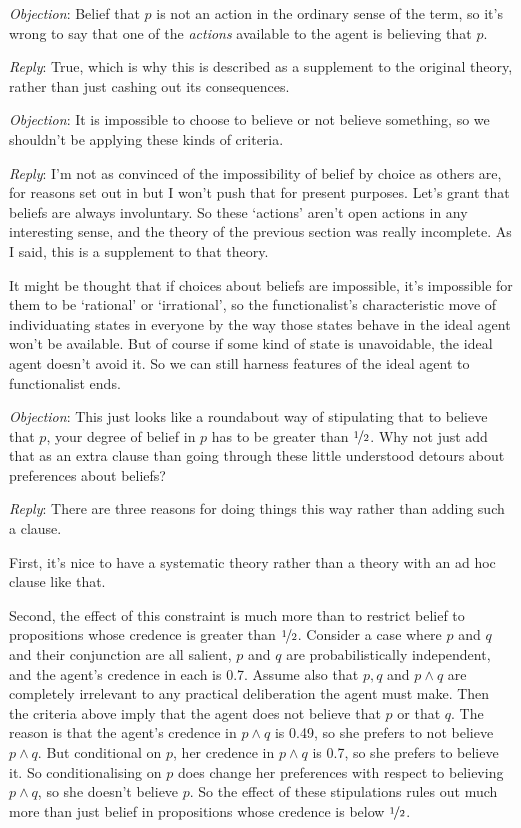 \medskip

\noindent \textit{Objection}: Belief that \(p\) is not an action in the ordinary sense of the term, so it's wrong to say that one of the \textit{actions} available to the agent is believing that \(p\).

\noindent \textit{Reply}: True, which is why this is described as a supplement to the original theory, rather than just cashing out its consequences.

\medskip

\noindent \textit{Objection}: It is impossible to choose to believe or not believe something, so we shouldn't be applying these kinds of criteria.

\noindent \textit{Reply}: I'm not as convinced of the impossibility of belief by choice as others are, for reasons set out in \cite{Weatherson2008-WEADAD} but I won't push that for present purposes. Let's grant that beliefs are always involuntary. So these `actions' aren't open actions in any interesting sense, and the theory of the previous section was really incomplete. As I said, this is a supplement to that theory.

It might be thought that if choices about beliefs are impossible, it's impossible for them to be `rational' or `irrational', so the functionalist's characteristic move of individuating states in everyone by the way those states behave in the ideal agent won't be available. But of course if some kind of state is unavoidable, the ideal agent doesn't avoid it. So we can still harness features of the ideal agent to functionalist ends. 

\medskip

\noindent \textit{Objection}: This just looks like a roundabout way of stipulating that to believe that \(p\), your degree of belief in \(p\) has to be greater than \(\nicefrac{1}{2}\). Why not just add that as an extra clause than going through these little understood detours about preferences about beliefs?

\noindent \textit{Reply}: There are three reasons for doing things this way rather than adding such a clause. 

First, it's nice to have a systematic theory rather than a theory with an ad hoc clause like that. 

Second, the effect of this constraint is much more than to restrict belief to propositions whose credence is greater than \(\nicefrac{1}{2}\). Consider a case where \(p\) and \(q\) and their conjunction are all salient, \(p\) and \(q\) are probabilistically independent, and the agent's credence in each is 0.7. Assume also that \(p, q\) and \(p \wedge q\) are completely irrelevant to any practical deliberation the agent must make. Then the criteria above imply that the agent does not believe that \(p\) or that \(q\). The reason is that the agent's credence in \(p \wedge q\) is 0.49, so she prefers to not believe \(p \wedge q\). But conditional on \(p\), her credence in \(p \wedge q\) is 0.7, so she prefers to believe it. So conditionalising on \(p\) does change her preferences with respect to believing \(p \wedge q\), so she doesn't believe \(p\). So the effect of these stipulations rules out much more than just belief in propositions whose credence is below \(\nicefrac{1}{2}\).


